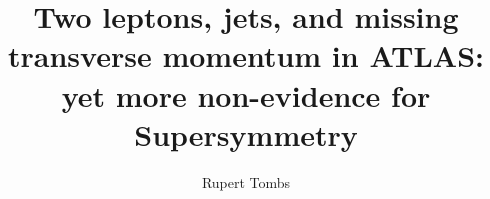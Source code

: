 \documentclass[nobind,draft,oneside]{minithesis}
\title{%
Two leptons, jets, and missing transverse momentum in ATLAS:\\
yet more non-evidence for Supersymmetry
}
\author{Rupert Tombs}
\begin{document}
\begin{frontmatter}

\end{frontmatter}


\begin{mainmatter}

\end{mainmatter}


\begin{appendices}

\end{appendices}


\begin{backmatter}

\end{backmatter}
\end{document}
